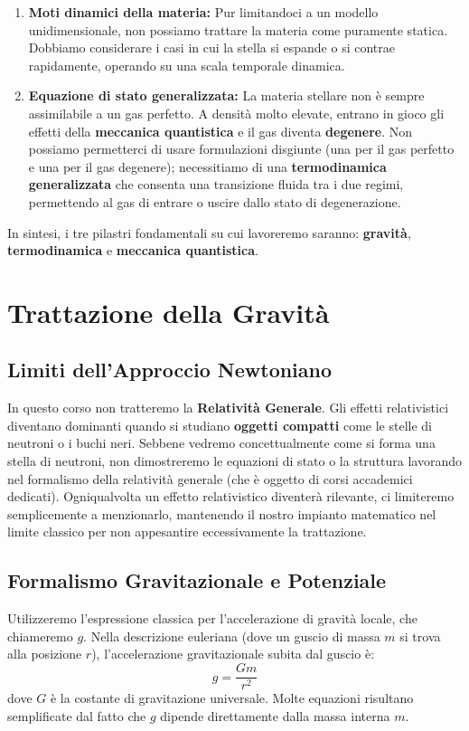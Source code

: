 \begin{enumerate}
\item \textbf{Moti dinamici della materia:} Pur limitandoci a un modello unidimensionale, non possiamo trattare la materia come puramente statica. Dobbiamo considerare i casi in cui la stella si espande o si contrae rapidamente, operando su una scala temporale dinamica.
\item \textbf{Equazione di stato generalizzata:} La materia stellare non è sempre assimilabile a un gas perfetto. A densità molto elevate, entrano in gioco gli effetti della \textbf{meccanica quantistica} e il gas diventa \textbf{degenere}. Non possiamo permetterci di usare formulazioni disgiunte (una per il gas perfetto e una per il gas degenere); necessitiamo di una \textbf{termodinamica generalizzata} che consenta una transizione fluida tra i due regimi, permettendo al gas di entrare o uscire dallo stato di degenerazione.
\end{enumerate}
In sintesi, i tre pilastri fondamentali su cui lavoreremo saranno: \textbf{gravità}, \textbf{termodinamica} e \textbf{meccanica quantistica}.

\section{Trattazione della Gravità}

\subsection{Limiti dell'Approccio Newtoniano}
In questo corso non tratteremo la \textbf{Relatività Generale}. Gli effetti relativistici diventano dominanti quando si studiano \textbf{oggetti compatti} come le stelle di neutroni o i buchi neri. Sebbene vedremo concettualmente come si forma una stella di neutroni, non dimostreremo le equazioni di stato o la struttura lavorando nel formalismo della relatività generale (che è oggetto di corsi accademici dedicati). Ogniqualvolta un effetto relativistico diventerà rilevante, ci limiteremo semplicemente a menzionarlo, mantenendo il nostro impianto matematico nel limite classico per non appesantire eccessivamente la trattazione.

\subsection{Formalismo Gravitazionale e Potenziale}
Utilizzeremo l'espressione classica per l'accelerazione di gravità locale, che chiameremo $g$. Nella descrizione euleriana (dove un guscio di massa $m$ si trova alla posizione $r$), l'accelerazione gravitazionale subita dal guscio è:
\begin{equation}
g = \frac{G m}{r^2}
\end{equation}
dove $G$ è la costante di gravitazione universale. Molte equazioni risultano semplificate dal fatto che $g$ dipende direttamente dalla massa interna $m$.

